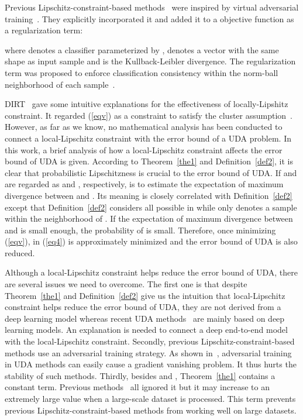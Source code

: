 \documentclass[journal,twocolumn]{IEEEtran}
\theoremstyle{definition}
\begin{document}
Previous Lipschitz-constraint-based methods~\cite{shu2018a,mao2019virtual} were inspired by  virtual adversarial training~\cite{miyato2018virtual}. They explicitly incorporated it and added it to a objective function as a regularization term:

where  denotes a classifier parameterized by ,  denotes a vector  with the same shape as input sample  and  is the Kullback-Leibler divergence. The regularization term was proposed to enforce classification consistency within the norm-ball neighborhood of each sample~\cite{miyato2018virtual}. 

DIRT~\cite{shu2018a} gave some intuitive explanations for the effectiveness of locally-Lipshitz constraint. It regarded (\ref{eqv}) as a constraint to satisfy the cluster assumption~\cite{grandvalet2004semi-supervised}. However, as far as we know, no mathematical analysis has been conducted to connect a local-Lipschitz constraint with the error bound of a UDA problem. In this work, a brief analysis of how a local-Lipschitz constraint affects the error bound of UDA is given. According to Theorem~\ref{the1} and Definition~\ref{def2}, it is clear that probabilistic Lipschitzness is crucial to the error bound of UDA. If  and  are regarded as  and , respectively,  is to estimate the expectation of maximum divergence between  and . Its meaning is closely correlated with Definition~\ref{def2} except that Definition~\ref{def2} considers all possible  in  while  only denotes a sample within the neighborhood of . If the expectation of maximum divergence between  and  is small enough, the probability of  is small.  Therefore, once minimizing (\ref{eqv}),  in (\ref{eq4}) is approximately minimized and the error bound of UDA is also reduced.

Although a local-Lipschitz constraint helps reduce the error bound of UDA, there are several issues we need to overcome. The first one is that despite Theorem~\ref{the1} and Definition~\ref{def2} give us the intuition that local-Lipschitz constraint helps reduce the error bound of UDA, they are not derived from a deep learning model whereas recent UDA methods~\cite{shu2018a,mao2019virtual} are mainly based on deep learning models. An explanation is needed to connect a deep end-to-end model with the local-Lipschitz constraint. Secondly, previous Lipschitz-constraint-based methods use an adversarial training strategy. As shown in~\cite{8833506}, adversarial training in UDA methods can easily cause a gradient vanishing problem. It thus hurts the stability of such methods. Thirdly, besides  and , Theorem~\ref{the1} contains a constant term. Previous methods~\cite{shu2018a,mao2019virtual} all ignored it but it may increase to an extremely large value when a large-scale dataset is processed. This term prevents previous Lipschitz-constraint-based methods from working well on large datasets.
\end{document}
